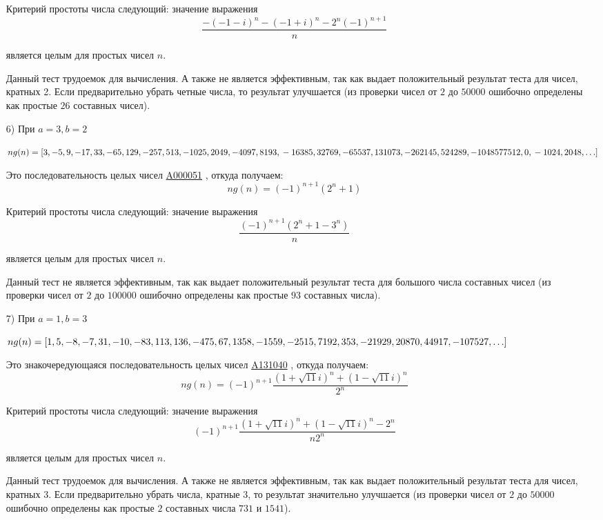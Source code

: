 \documentclass[
russian,
cp1251,
14pt,
simple
]{eskdtext}
\theoremstyle{definition}
\begin{document}
\begin{itemize}
Критерий простоты числа следующий: значение выражения
$$
\frac{-(-1-i)^{n}-(-1+i)^{n}-{2}^{n}(-1)^{n+1}}{n}
$$

является целым для простых чисел $n$.

Данный тест трудоемок для вычисления. А также не является эффективным, так как выдает положительный результат теста для чисел, кратных 2. Если предварительно убрать четные числа, то результат улучшается (из проверки чисел от $2$ до $50000$ ошибочно определены как простые $26$ составных чисел).

\item[6)] При $a=3, b=2$

\begin{math}
ng(n)=[3,-5,9,-17,33,-65,129,-257,513,-1025,2049,-4097,8193,\\
-16385,32769,-65537,131073,-262145,524289,-1048577512,0,\\
-1024,2048,\ldots]
\end{math}

Это последовательность целых чисел \href{http://oeis.org/A000051}{A000051} \cite{oeis}, откуда получаем:
$$
ng(n)=(-1)^{n+1}(2^{n}+1)
$$

Критерий простоты числа следующий: значение выражения
$$
\frac{(-1)^{n+1}(2^{n}+1-3^{n})}{n}
$$

является целым для простых чисел $n$.

Данный тест не является эффективным, так как выдает положительный результат теста для большого числа составных чисел (из проверки чисел от $2$ до $100000$ ошибочно определены как простые $93$ составных числа).

\item[7)] При $a=1, b=3$

\begin{math}
ng(n)=[1,5,-8,-7,31,-10,-83,113,136,-475,67,1358,-1559,-2515,\\
7192,353,-21929,20870,44917,-107527,\ldots]
\end{math}

Это знакочередующаяся последовательность целых чисел \href{http://oeis.org/A131040}{A131040} \cite{oeis}, откуда получаем:
$$
ng(n)=(-1)^{n+1}\frac{(1+\sqrt{11} i)^{n}+(1-\sqrt{11} i)^{n}}{2^{n}}
$$

Критерий простоты числа следующий: значение выражения
$$
(-1)^{n+1}\frac{(1+\sqrt{11} i)^{n}+(1-\sqrt{11} i)^{n}-2^{n}}{n 2^{n}}
$$

является целым для простых чисел $n$.

Данный тест трудоемок для вычисления. А также не является эффективным, так как выдает положительный результат теста для чисел, кратных 3. Если предварительно убрать числа, кратные 3, то результат значительно улучшается (из проверки чисел от $2$ до $50000$ ошибочно определены как простые $2$ составных числа $731$ и $1541$).


\end{itemize}
\end{document}
